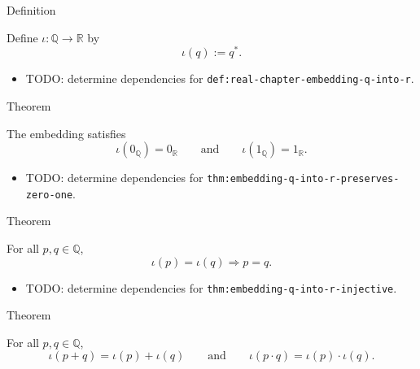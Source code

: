 \begin{definitionbox}{Definition}
\begin{definition}
\label{def:real-chapter-embedding-q-into-r}
Define $\iota:\mathbb{Q}\to\mathbb{R}$ by
\[
\iota(q):=q^{\ast}.
\]
\end{definition}
\end{definitionbox}

\begin{dependencies}
\begin{itemize}
  \item TODO: determine dependencies for \texttt{def:real-chapter-embedding-q-into-r}.
\end{itemize}
\end{dependencies}

\begin{theorembox}{Theorem}
\begin{theorem}
\label{thm:embedding-q-into-r-preserves-zero-one}
The embedding satisfies
\[
\iota(0_{\mathbb{Q}})=0_{\mathbb{R}}
\qquad\text{and}\qquad
\iota(1_{\mathbb{Q}})=1_{\mathbb{R}}.
\]
\end{theorem}
\end{theorembox}

\begin{dependencies}
\begin{itemize}
  \item TODO: determine dependencies for \texttt{thm:embedding-q-into-r-preserves-zero-one}.
\end{itemize}
\end{dependencies}

\begin{theorembox}{Theorem}
\begin{theorem}
\label{thm:embedding-q-into-r-injective}
For all $p,q\in\mathbb{Q}$,
\[
\iota(p)=\iota(q) \Longrightarrow p=q.
\]
\end{theorem}
\end{theorembox}

\begin{dependencies}
\begin{itemize}
  \item TODO: determine dependencies for \texttt{thm:embedding-q-into-r-injective}.
\end{itemize}
\end{dependencies}

\begin{theorembox}{Theorem}
\begin{theorem}
\label{thm:embedding-q-into-r-preserves-arithmetic}
For all $p,q\in\mathbb{Q}$,
\[
\iota(p+q)=\iota(p)+\iota(q)
\qquad\text{and}\qquad
\iota(p\cdot q)=\iota(p)\cdot\iota(q).
\]
\end{theorem}
\end{theorembox}

